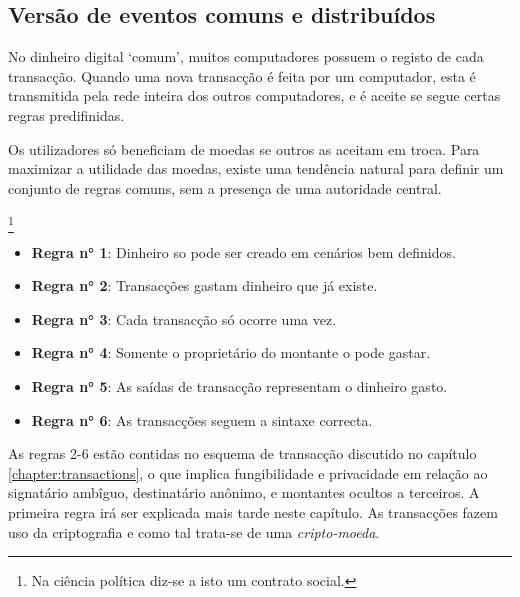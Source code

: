 \subsection{Versão de eventos comuns e distribuídos}
\label{subsec:shared-version-events}

No dinheiro digital `comum', muitos computadores possuem o registo de cada transacção. Quando uma nova transacção é feita por um computador, esta é transmitida pela rede inteira dos outros computadores, e é aceite se segue certas regras predifinidas.  


Os utilizadores só beneficiam de moedas se outros as aceitam em troca. Para maximizar a utilidade das moedas, existe uma tendência natural para definir um conjunto de regras comuns, sem a presença de uma autoridade central.


\footnote{Na ciência política diz-se a isto um contrato social.}

\begin{itemize}
    \item[] \textbf{Regra n° 1}: Dinheiro so pode ser creado em cenários bem definidos.
    \item[] \textbf{Regra n° 2}: Transacções gastam dinheiro que já existe.
    \item[] \textbf{Regra n° 3}: Cada transacção só ocorre uma vez.
    \item[] \textbf{Regra n° 4}: Somente o proprietário do montante o pode gastar.
    \item[] \textbf{Regra n° 5}: As saídas de transacção representam o dinheiro gasto.     
    \item[] \textbf{Regra n° 6}: As transacções seguem a sintaxe correcta.
\end{itemize}

As regras 2-6 estão contidas no esquema de transacção discutido no capítulo \ref{chapter:transactions}, o que implica fungibilidade e privacidade em relação ao signatário ambîguo, destinatário anônimo, e montantes ocultos a terceiros. A primeira regra irá ser explicada mais tarde neste capítulo. As transacções fazem uso da criptografia e como tal trata-se de uma {\em cripto-moeda}.  


